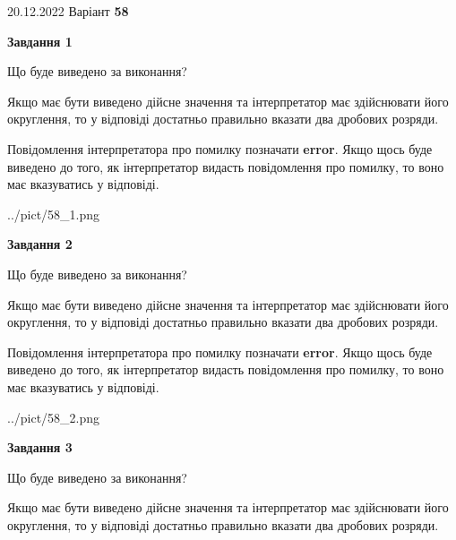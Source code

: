 \documentclass[12pt, ukrainian]{article}
\begin{document}
{20.12.2022 Варіант \No \textbf { 58 }\par}
{
\begin {Large}

{\begin {center}\textbf{Завдання 1}\end {center}}\par
Що буде виведено за виконання? \par

Якщо має бути виведено дійсне значення та інтерпретатор має здійснювати його округлення, 
то у відповіді достатньо правильно вказати два дробових розряди.

Повідомлення інтерпретатора про помилку позначати \textbf{error}.
Якщо щось буде виведено до того, як інтерпретатор видасть повідомлення про помилку, 
то воно має вказуватись у відповіді. \par

\begin{center}
	{../pict/58_1.png}
\end{center}
\newpage

{\begin {center}\textbf{Завдання 2}\end {center}}\par
Що буде виведено за виконання? \par

Якщо має бути виведено дійсне значення та інтерпретатор має здійснювати його округлення, 
то у відповіді достатньо правильно вказати два дробових розряди.

Повідомлення інтерпретатора про помилку позначати \textbf{error}.
Якщо щось буде виведено до того, як інтерпретатор видасть повідомлення про помилку, 
то воно має вказуватись у відповіді. \par

\begin{center}
	{../pict/58_2.png}
\end{center}
\newpage

{\begin {center}\textbf{Завдання 3}\end {center}}\par
Що буде виведено за виконання? \par

Якщо має бути виведено дійсне значення та інтерпретатор має здійснювати його округлення, 
то у відповіді достатньо правильно вказати два дробових розряди.


\end{Large}}
\end{document}

